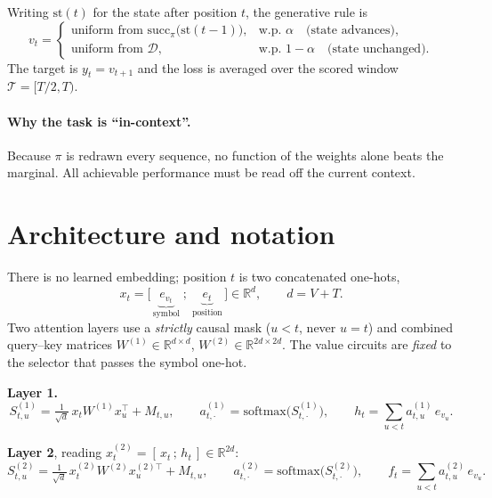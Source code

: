 \documentclass[11pt,a4paper]{article}
\theoremstyle{plain}
\theoremstyle{definition}
\newcommand{\Dis}{\mathcal{D}}
\newcommand{\Win}{\mathcal{T}}
\newcommand{\1}{\mathbf{1}}
\begin{document}
Writing $\mathrm{st}(t)$ for the state after position $t$, the generative rule is
\begin{equation}
v_t=\begin{cases}
\text{uniform from }\mathrm{succ}_\pi\bigl(\mathrm{st}(t-1)\bigr),
& \text{w.p. }\alpha\quad\text{(state advances)},\\[3pt]
\text{uniform from }\Dis, & \text{w.p. }1-\alpha\quad\text{(state unchanged)}.
\end{cases}
\end{equation}
The target is $y_t=v_{t+1}$ and the loss is averaged over the scored window $\Win=[T/2,T)$.

\paragraph{Why the task is ``in-context''.}
Because $\pi$ is redrawn every sequence, no function of the weights alone beats the marginal. All
achievable performance must be read off the current context.

\section{Architecture and notation}\label{sec:arch}

There is no learned embedding; position $t$ is two concatenated one-hots,
\begin{equation}
x_t=\bigl[\,\underbrace{e_{v_t}}_{\text{symbol}}\;;\;\underbrace{e_t}_{\text{position}}\,\bigr]
\in\mathbb{R}^{d},\qquad d=V+T .
\end{equation}
Two attention layers use a \emph{strictly} causal mask ($u<t$, never $u=t$) and combined
query--key matrices $W^{(1)}\in\mathbb{R}^{d\times d}$, $W^{(2)}\in\mathbb{R}^{2d\times2d}$. The
value circuits are \emph{fixed} to the selector that passes the symbol one-hot.

\medskip\noindent\textbf{Layer 1.}
\begin{equation}
S^{(1)}_{t,u}=\tfrac{1}{\sqrt d}\,x_tW^{(1)}x_u^\top+M_{t,u},\qquad
a^{(1)}_{t,\cdot}=\mathrm{softmax}\bigl(S^{(1)}_{t,\cdot}\bigr),\qquad
h_t=\sum_{u<t}a^{(1)}_{t,u}\,e_{v_u}.
\end{equation}

\noindent\textbf{Layer 2}, reading $x^{(2)}_t=[\,x_t\,;\,h_t\,]\in\mathbb{R}^{2d}$:
\begin{equation}
S^{(2)}_{t,u}=\tfrac{1}{\sqrt d}\,x^{(2)}_tW^{(2)}x^{(2)\top}_u+M_{t,u},\qquad
a^{(2)}_{t,\cdot}=\mathrm{softmax}\bigl(S^{(2)}_{t,\cdot}\bigr),\qquad
f_t=\sum_{u<t}a^{(2)}_{t,u}\,e_{v_u}.
\end{equation}
\end{document}
